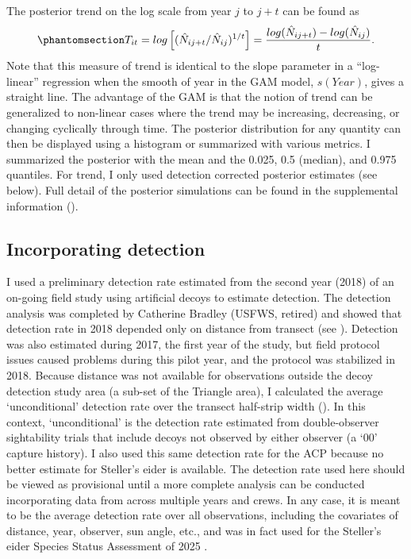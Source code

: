 \documentclass[
  10pt,
  letterpaper,
]{article}
\begin{document}
The posterior trend on the log scale from year \(j\) to \(j+t\) can be
found as
\begin{equation}\phantomsection\label{eq-6}{T_{it} = log \left[ (\hat N_{ij+t}/\hat N_{ij})^{1/t} \right] = \frac{log(\hat N_{ij+t}) - log(\hat N_{ij})}{t}.}\end{equation}
Note that this measure of trend is identical to the slope parameter in a
``log-linear'' regression when the smooth of year in the GAM model,
\(s(Year)\), gives a straight line. The advantage of the GAM is that the
notion of trend can be generalized to non-linear cases where the trend
may be increasing, decreasing, or changing cyclically through time. The
posterior distribution for any quantity can then be displayed using a
histogram or summarized with various metrics. I summarized the posterior
with the mean and the 0.025, 0.5 (median), and 0.975 quantiles. For
trend, I only used detection corrected posterior estimates (see below).
Full detail of the posterior simulations can be found in the
supplemental information ().

\subsection{Incorporating detection}\label{incorporating-detection}

I used a preliminary detection rate estimated from the second year
(2018) of an on-going field study using artificial decoys to estimate
detection. The detection analysis was completed by Catherine Bradley
(USFWS, retired) and showed that detection rate in 2018 depended only on
distance from transect (see ). Detection was also
estimated during 2017, the first year of the study, but field protocol
issues caused problems during this pilot year, and the protocol was
stabilized in 2018. Because distance was not available for observations
outside the decoy detection study area (a sub-set of the Triangle area),
I calculated the average `unconditional' detection rate over the
transect half-strip width (). In this
context, `unconditional' is the detection rate estimated from
double-observer sightability trials that include decoys not observed by
either observer (a `00' capture history). I also used this same
detection rate for the ACP because no better estimate for Steller's
eider is available. The detection rate used here should be viewed as
provisional until a more complete analysis can be conducted
incorporating data from across multiple years and crews. In any case, it
is meant to be the average detection rate over all observations,
including the covariates of distance, year, observer, sun angle, etc.,
and was in fact used for the Steller's eider Species Status Assessment
of 2025 \citep{steiSSA2025}.
\end{document}
